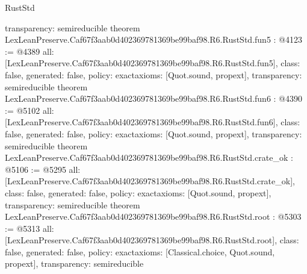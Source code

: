 \begin{lexlean}{RustStd}
\begin{coremodule}
{  transparency: semireducible
}
theorem LexLeanPreserve.Caf67f3aab0d402369781369be99baf98.R6.RustStd.fun5 : @4123 := @4389 {
  all: [LexLeanPreserve.Caf67f3aab0d402369781369be99baf98.R6.RustStd.fun5],
  class: false,
  generated: false,
  policy: exact{axioms: [Quot.sound, propext]},
  transparency: semireducible
}
theorem LexLeanPreserve.Caf67f3aab0d402369781369be99baf98.R6.RustStd.fun6 : @4390 := @5102 {
  all: [LexLeanPreserve.Caf67f3aab0d402369781369be99baf98.R6.RustStd.fun6],
  class: false,
  generated: false,
  policy: exact{axioms: [Quot.sound, propext]},
  transparency: semireducible
}
theorem LexLeanPreserve.Caf67f3aab0d402369781369be99baf98.R6.RustStd.crate_ok : @5106 := @5295 {
  all: [LexLeanPreserve.Caf67f3aab0d402369781369be99baf98.R6.RustStd.crate_ok],
  class: false,
  generated: false,
  policy: exact{axioms: [Quot.sound, propext]},
  transparency: semireducible
}
theorem LexLeanPreserve.Caf67f3aab0d402369781369be99baf98.R6.RustStd.root : @5303 := @5313 {
  all: [LexLeanPreserve.Caf67f3aab0d402369781369be99baf98.R6.RustStd.root],
  class: false,
  generated: false,
  policy: exact{axioms: [Classical.choice, Quot.sound, propext]},
  transparency: semireducible
}


\end{coremodule}
\end{lexlean}
